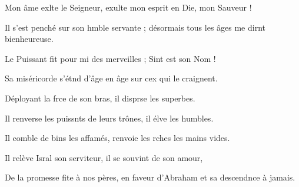 \item Mon âme exlte le Seigneur,\psstar{} exulte mon esprit en Die, mon Sauveur !
\item Il s’est penché sur son hmble servante ;\psstar{} désormais tous les âges me dirnt bienheureuse.
\item Le Puissant fit pour mi des merveilles ;\psstar{} Sint est son Nom !
\item Sa miséricorde s’étnd d’âge en âge\psstar{} sur cex qui le craignent.
\item Déployant la frce de son bras,\psstar{} il disprse les superbes.
\item Il renverse les puissnts de leurs trônes,\psstar{} il élve les humbles.
\item Il comble de bins les affamés,\psstar{} renvoie les rches les mains vides.
\item Il relève Isral son serviteur,\psstar{} il se souvint de son amour,
\item De la promesse fite à nos pères,\psstar{} en faveur d’Abraham et sa descendnce à jamais.